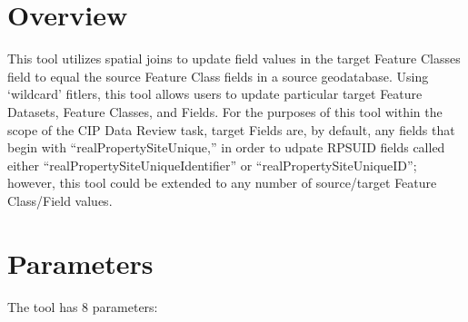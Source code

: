 \documentclass[openany]{book}
\theoremstyle{definition}
\theoremstyle{definition}
\theoremstyle{definition}
\theoremstyle{remark}
\begin{document}
\section{Overview}\label{overview-1}

This tool utilizes spatial joins to update field values in the target
Feature Classes field to equal the source Feature Class fields in a
source geodatabase. Using `wildcard' fitlers, this tool allows users to
update particular target Feature Datasets, Feature Classes, and Fields.
For the purposes of this tool within the scope of the CIP Data Review
task, target Fields are, by default, any fields that begin with
``realPropertySiteUnique,'' in order to udpate RPSUID fields called
either ``realPropertySiteUniqueIdentifier'' or
``realPropertySiteUniqueID''; however, this tool could be extended to
any number of source/target Feature Class/Field values.

\section{Parameters}\label{parameters-1}

The tool has 8 parameters:
\end{document}
